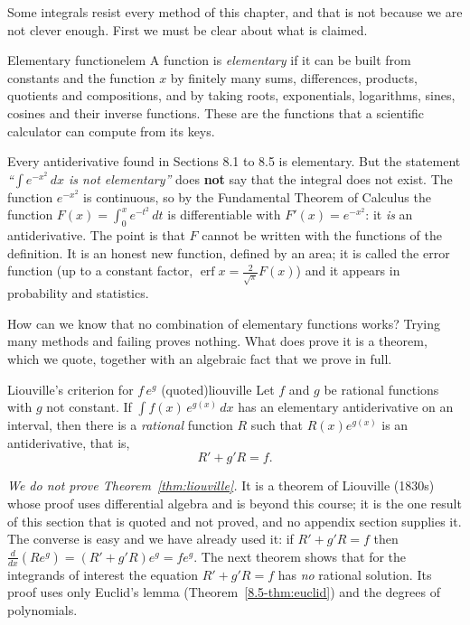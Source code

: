 \documentclass[11pt]{article}
\begin{document}
Some integrals resist every method of this chapter, and that is not because we are not clever enough. First we must be clear about what is claimed.

\begin{defn}{Elementary function}{elem}
A function is \emph{elementary} if it can be built from constants and the function $x$ by finitely many sums, differences, products, quotients and compositions, and by taking roots, exponentials, logarithms, sines, cosines and their inverse functions. These are the functions that a scientific calculator can compute from its keys.
\end{defn}

Every antiderivative found in Sections 8.1 to 8.5 is elementary. But the statement \emph{``$\int e^{-x^2}\,dx$ is not elementary''} does \textbf{not} say that the integral does not exist. The function $e^{-x^2}$ is continuous, so by the Fundamental Theorem of Calculus the function $F(x)=\int_0^xe^{-t^2}\,dt$ is differentiable with $F'(x)=e^{-x^2}$: it \emph{is} an antiderivative. The point is that $F$ cannot be written with the functions of the definition. It is an honest new function, defined by an area; it is called the error function (up to a constant factor, $\operatorname{erf}x=\frac2{\sqrt\pi}F(x)$) and it appears in probability and statistics.

How can we know that no combination of elementary functions works? Trying many methods and failing proves nothing. What does prove it is a theorem, which we quote, together with an algebraic fact that we prove in full.

\begin{thm}{Liouville's criterion for $f\,e^g$ (quoted)}{liouville}
Let $f$ and $g$ be rational functions with $g$ not constant. If $\int f(x)\,e^{g(x)}\,dx$ has an elementary antiderivative on an interval, then there is a \emph{rational} function $R$ such that $R(x)e^{g(x)}$ is an antiderivative, that is,
\[R'+g'R=f .\]
\end{thm}
\emph{We do not prove Theorem~\ref{thm:liouville}.} It is a theorem of Liouville (1830s) whose proof uses differential algebra and is beyond this course; it is the one result of this section that is quoted and not proved, and no appendix section supplies it. The converse is easy and we have already used it: if $R'+g'R=f$ then $\frac d{dx}\left(Re^g\right)=\left(R'+g'R\right)e^g=fe^g$. The next theorem shows that for the integrands of interest the equation $R'+g'R=f$ has \emph{no} rational solution. Its proof uses only Euclid's lemma (Theorem~\ref{8.5-thm:euclid}) and the degrees of polynomials.
\end{document}
